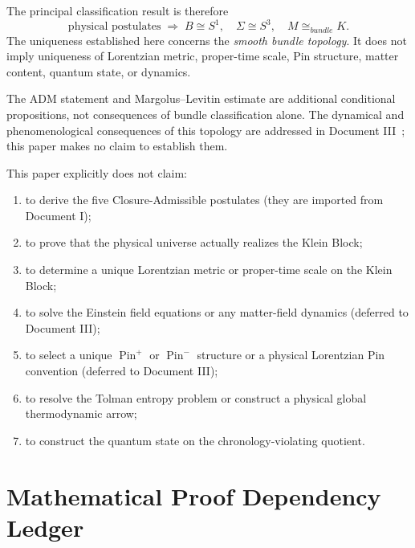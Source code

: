 \documentclass[11pt]{article}
\theoremstyle{canonmath}
\theoremstyle{canonpostulate}
\theoremstyle{canonproposition}
\providecommand{\Klein}{\mathcal{K}}
\providecommand{\M}{\mathcal{M}}
\providecommand{\Sone}{S^1}
\providecommand{\Sthree}{S^3}
\providecommand{\Pin}{\operatorname{Pin}}
\def\mathrm#1{#1}%
\def\mathcal#1{#1}%
\begin{document}
The principal classification result is therefore
\[
\boxed{
\text{physical postulates}
\;\Longrightarrow\;
B\cong\Sone,
\quad
\Sigma\cong\Sthree,
\quad
\M\cong_{\mathrm{bundle}}\Klein.
}
\]
The uniqueness established here concerns the \emph{smooth bundle topology}. It does not imply uniqueness of Lorentzian metric, proper-time scale, Pin structure, matter content, quantum state, or dynamics.

The ADM statement and Margolus--Levitin estimate are additional conditional propositions, not consequences of bundle classification alone. The dynamical and phenomenological consequences of this topology are addressed in Document III~\cite{CanonHow}; this paper makes no claim to establish them.

\bigskip
\begin{excludedclaims}
This paper explicitly does not claim:
\begin{enumerate}
\item to derive the five Closure-Admissible postulates (they are imported from Document I);
\item to prove that the physical universe actually realizes the Klein Block;
\item to determine a unique Lorentzian metric or proper-time scale on the Klein Block;
\item to solve the Einstein field equations or any matter-field dynamics (deferred to Document III);
\item to select a unique $\Pin^+$ or $\Pin^-$ structure or a physical Lorentzian Pin convention (deferred to Document III);
\item to resolve the Tolman entropy problem or construct a physical global thermodynamic arrow;
\item to construct the quantum state on the chronology-violating quotient.
\end{enumerate}
\end{excludedclaims}

\newpage
\appendix
\section{Mathematical Proof Dependency Ledger}
\end{document}
